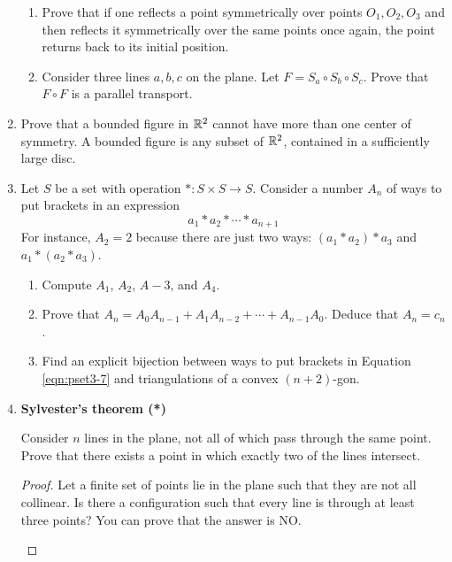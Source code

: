 \documentclass[../main.tex]{subfiles}
\begin{document}
\begin{enumerate}
\begin{enumerate}
        \item Prove that if one reflects a point symmetrically over points $O_1,O_2,O_3$ and then reflects it symmetrically over the same points once again, the point returns back to its initial position.
        \item Consider three lines $a,b,c$ on the plane. Let $F=S_a\circ S_b\circ S_c$. Prove that $F\circ F$ is a parallel transport.
    \end{enumerate}
    \item Prove that a bounded figure in $\mathbb{R}^2$ cannot have more than one center of symmetry. A bounded figure is any subset of $\mathbb{R}^2$, contained in a sufficiently large disc.
    \item Let $S$ be a set with operation $*:S\times S\to S$. Consider a number $A_n$ of ways to put brackets in an expression
    \begin{equation}\label{eqn:pset3-7}
        a_1*a_2*\cdots*a_{n+1}
    \end{equation}
    For instance, $A_2=2$ because there are just two ways: $(a_1*a_2)*a_3$ and $a_1*(a_2*a_3)$.
    \begin{enumerate}
        \item Compute $A_1$, $A_2$, $A-3$, and $A_4$.
        \item Prove that $A_n=A_0A_{n-1}+A_1A_{n-2}+\cdots+A_{n-1}A_0$. Deduce that $A_n=c_n$.
        \item Find an explicit bijection between ways to put brackets in Equation \ref{eqn:pset3-7} and triangulations of a convex $(n+2)$-gon.
    \end{enumerate}
    \item \textbf{Sylvester's theorem (*)}\par
    Consider $n$ lines in the plane, not all of which pass through the same point. Prove that there exists a point in which exactly two of the lines intersect.
    \begin{proof}
        Let a finite set of points lie in the plane such that they are not all collinear. Is there a configuration such that every line is through at least three points? You can prove that the answer is NO.\par
        \begin{figure}[h!]
            \centering
\end{figure}
\end{proof}
\end{enumerate}
\end{document}
